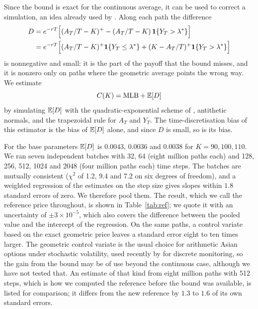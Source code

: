 Since the bound is exact for the continuous average, it can be used to correct a simulation, an idea
already used by \citet[Section~5]{FusaiKyriakou2016}. Along each path the difference
\begin{equation}\label{eq:gap}
\begin{aligned}
D &= e^{-rT}\Bigl[(A_T/T-K)^+ - (A_T/T-K)\,\mathbf{1}\{Y_T>\lambda^\ast\}\Bigr]\\
  &= e^{-rT}\Bigl[(A_T/T-K)^+\mathbf{1}\{Y_T\le\lambda^\ast\} + (K-A_T/T)^+\mathbf{1}\{Y_T>\lambda^\ast\}\Bigr]
\end{aligned}
\end{equation}
is nonnegative and small: it is the part of the payoff that the bound misses, and it is nonzero only on
paths where the geometric average points the wrong way. We estimate
\begin{equation*}
C(K) = \mathrm{MLB} + \mathbb{E}[D]
\end{equation*}
by simulating $\mathbb{E}[D]$ with the quadratic-exponential scheme of \citet{Andersen2008}, antithetic normals,
and the trapezoidal rule for $A_T$ and $Y_T$. The time-discretisation bias of this estimator is the bias
of $\mathbb{E}[D]$ alone, and since $D$ is small, so is its bias.

For the base parameters $\mathbb{E}[D]$ is $0.0043$, $0.0036$ and $0.0038$ for $K=90,100,110$. We ran seven
independent batches with 32, 64 (eight million paths each) and 128, 256, 512, 1024 and 2048 (four million
paths each) time steps. The batches are mutually consistent ($\chi^2$ of 1.2, 9.4 and 7.2 on six degrees
of freedom), and a weighted regression of the estimates on the step size gives slopes within $1.8$
standard errors of zero. We therefore pool them. The result, which we call the reference price
throughout, is shown in Table~\ref{tab:ref}; we quote it with an uncertainty of $\pm3\times10^{-5}$,
which also covers the difference between the pooled value and the intercept of the regression. On the same
paths, a control variate based on the exact geometric price \citep{KemnaVorst1990} leaves a standard
error eight to ten times larger. The geometric control variate is the usual choice for arithmetic Asian
options under stochastic volatility, used recently by \citet{CustersKarbachFriesen2026} for discrete
monitoring, so the gain from the bound may be of use beyond the continuous case, although we have not
tested that. An estimate of that kind from eight million paths with 512 steps, which
is how we computed the reference before the bound was available, is listed for comparison; it differs
from the new reference by $1.3$ to $1.6$ of its own standard errors.

